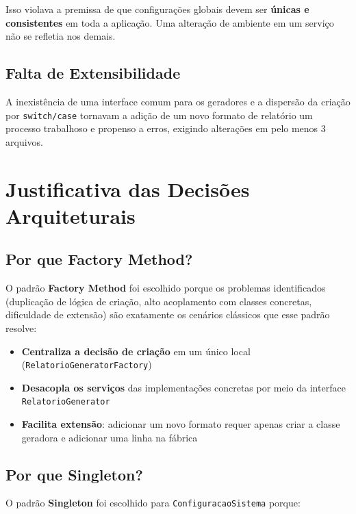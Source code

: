 \documentclass[12pt, a4paper]{article}
\begin{document}
Isso violava a premissa de que configurações globais devem ser \textbf{únicas e consistentes} em toda a aplicação. Uma alteração de ambiente em um serviço não se refletia nos demais.

\subsection{Falta de Extensibilidade}

A inexistência de uma interface comum para os geradores e a dispersão da criação por \texttt{switch/case} tornavam a adição de um novo formato de relatório um processo trabalhoso e propenso a erros, exigindo alterações em pelo menos 3 arquivos.

\section{Justificativa das Decisões Arquiteturais}

\subsection{Por que Factory Method?}

O padrão \textbf{Factory Method} foi escolhido porque os problemas identificados (duplicação de lógica de criação, alto acoplamento com classes concretas, dificuldade de extensão) são exatamente os cenários clássicos que esse padrão resolve:

\begin{itemize}
    \item \textbf{Centraliza a decisão de criação} em um único local (\texttt{RelatorioGeneratorFactory})
    \item \textbf{Desacopla os serviços} das implementações concretas por meio da interface \texttt{RelatorioGenerator}
    \item \textbf{Facilita extensão}: adicionar um novo formato requer apenas criar a classe geradora e adicionar uma linha na fábrica
\end{itemize}

\subsection{Por que Singleton?}

O padrão \textbf{Singleton} foi escolhido para \texttt{ConfiguracaoSistema} porque:
\end{document}
